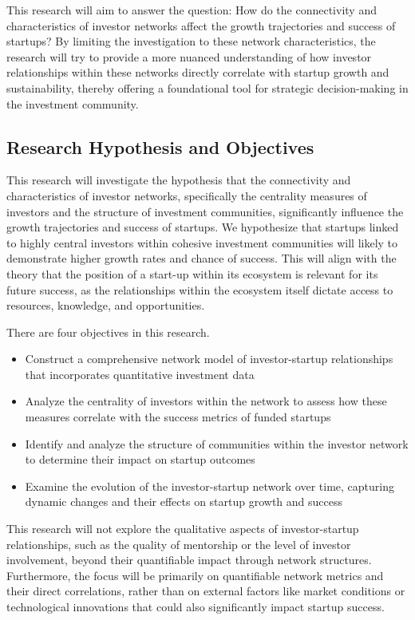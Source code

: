 \documentclass[a4paper,11pt]{article}
\begin{document}
This research will aim to answer the question: How do the connectivity and characteristics of investor networks affect the growth trajectories and success of startups? By limiting the investigation to these network characteristics, the research will try to provide a more nuanced understanding of how investor relationships within these networks directly correlate with startup growth and sustainability, thereby offering a foundational tool for strategic decision-making in the investment community.

\subsection{Research Hypothesis and Objectives}
This research will investigate the hypothesis that the connectivity and characteristics of investor networks, specifically the centrality measures of investors and the structure of investment communities, significantly influence the growth trajectories and success of startups. We hypothesize that startups linked to highly central investors within cohesive investment communities will likely to demonstrate higher growth rates and chance of success. This will align with the theory that the position of a start-up within its ecosystem is relevant for its future success, as the relationships within the ecosystem itself dictate access to resources, knowledge, and opportunities.

There are four objectives in this research. 
\begin{itemize}
    \item Construct a comprehensive network model of investor-startup relationships that incorporates quantitative investment data
    \item Analyze the centrality of investors within the network to assess how these measures correlate with the success metrics of funded startups
    \item Identify and analyze the structure of communities within the investor network to determine their impact on startup outcomes
    \item Examine the evolution of the investor-startup network over time, capturing dynamic changes and their effects on startup growth and success
\end{itemize}

This research will not explore the qualitative aspects of investor-startup relationships, such as the quality of mentorship or the level of investor involvement, beyond their quantifiable impact through network structures. Furthermore, the focus will be primarily on quantifiable network metrics and their direct correlations, rather than on external factors like market conditions or technological innovations that could also significantly impact startup success.
\end{document}

